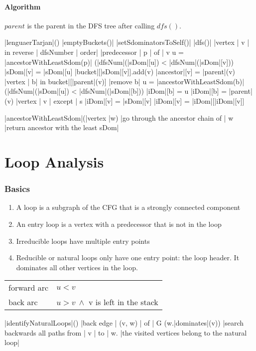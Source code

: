 \documentclass[a4paper,12pt, notitlepage]{article}
\newcommand{\negv}{\vspace{-0.7cm}}
\begin{document}
\paragraph*{Algorithm}
$parent$ is the parent in the DFS tree after calling $dfs()$.
\begin{program}
\PROC |lenguaerTarjan|() \BODY
    |emptyBuckets()|
    |setSdominatorsToSelf()|
    |dfs()|
    \FOREACH |vertex | v | in reverse | dfsNumber | order| \DO
        \FOREACH |predecessor | p | of | v \DO
            u = |ancestorWithLeastSdom(p)|
            \IF (|dfsNum|(|sDom|[u]) < |dfsNum|(|sDom|[v])) \AR*
                |sDom|[v] = |sDom|[u] 
            \FI
        \OD
        |bucket|[|sDom|[v]].add(v)
        |ancestor|[v] = |parent|(v) 
        \FOREACH |vertex | b| in bucket|[|parent|(v)] \DO
            |remove b|
            u = |ancestorWithLeastSdom(b)|
            \IF (|dfsNum|(|sDom|[u]) < |dfsNum|(|sDom|[b])) \AR*
                |iDom|[b] = u
            \ELSE
                |iDom|[b] = |parent|(v)
            \FI
        \OD
    \OD
    \FOREACH |vertex | v | except | s \DO
        \IF |iDom|[v] \not= |sDom|[v] \AR*
            |iDom|[v] = |iDom|[|iDom|[v]]
        \FI
    \OD
\end{program}
\negv
\begin{program}
\PROC |ancestorWithLeastSdom|(|vertex |w) \BODY
    |go through the ancestor chain of | w
    |return ancestor with the least sDom|
\end{program}

\section*{Loop Analysis}
\subsubsection*{Basics}
\begin{enumerate}
\item A loop is a subgraph of the CFG that is a strongly connected component
\item An entry loop is a vertex with a predecessor that is not in the loop
\item Irreducible loops have multiple entry points
\item Reducible or natural loops only have one entry point: the loop header. 
It dominates all other vertices in the loop.
\end{enumerate}
\begin{tabular}{ll}
forward arc & $u < v$\\
back arc & $u > v \ \land $ v is left in the stack\\
\end{tabular}
\negv
\begin{program}
\PROC |identifyNaturalLoops|() \BODY
    \FOREACH |back edge | (v, w) | of | G \DO
        \IF (w.|dominates|(v)) \AR*
            |search backwards all paths from | v | to | w.
            |the visited vertices belong to the natural loop|
        \FI
    \OD
\end{program}
\end{document}
